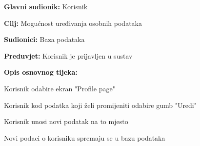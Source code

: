 					\noindent {}
					\begin{packed_item}
						
						\item \textbf{Glavni sudionik: }Korisnik
						\item  \textbf{Cilj:} Mogućnost uređivanja osobnih podataka
						\item  \textbf{Sudionici:} Baza podataka
						\item  \textbf{Preduvjet:} Korisnik je prijavljen u sustav
						\item  \textbf{Opis osnovnog tijeka:}
						
						\item[] \begin{packed_enum}
							
							\item Korisnik odabire ekran "Profile page"
							\item Korisnik kod podatka koji želi promijeniti odabire gumb "Uredi"
							\item Korisnik unosi novi podatak na to mjesto
							\item Novi podaci o korisniku spremaju se u bazu podataka
						\end{packed_enum}
						
					\end{packed_item}
					\noindent {}
